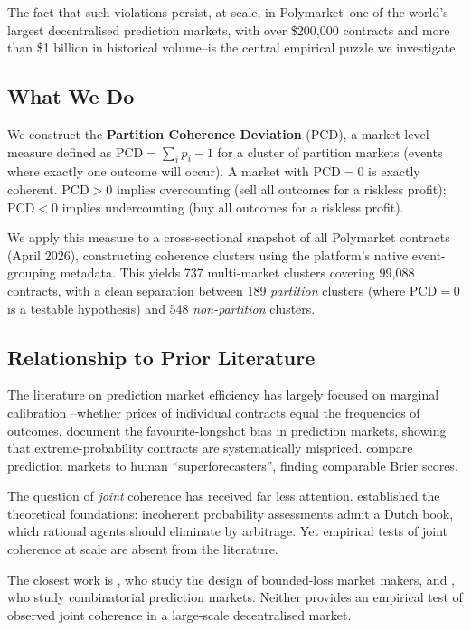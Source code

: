 \documentclass[12pt,a4paper]{article}
\theoremstyle{definition}
\theoremstyle{remark}
\newcommand{\PCD}{\mathrm{PCD}}
\begin{document}
The fact that such violations persist, at scale, in Polymarket--one of the
world's largest decentralised prediction markets, with over \$200{,}000 contracts
and more than \$1 billion in historical volume--is the central empirical puzzle
we investigate.

\subsection{What We Do}

We construct the \textbf{Partition Coherence Deviation} ($\PCD$), a market-level
measure defined as $\PCD = \sum_{i} p_i - 1$ for a cluster of partition markets
(events where exactly one outcome will occur).
A market with $\PCD = 0$ is exactly coherent.
$\PCD > 0$ implies overcounting (sell all outcomes for a riskless profit);
$\PCD < 0$ implies undercounting (buy all outcomes for a riskless profit).

We apply this measure to a cross-sectional snapshot of all Polymarket contracts
(April 2026), constructing coherence clusters using the platform's native
event-grouping metadata.
This yields 737 multi-market clusters covering 99{,}088 contracts,
with a clean separation between 189 \emph{partition} clusters (where $\PCD = 0$
is a testable hypothesis) and 548 \emph{non-partition} clusters.

\subsection{Relationship to Prior Literature}

The literature on prediction market efficiency has largely focused on marginal
calibration \citep{wolfers2004,berg2008}--whether prices of individual contracts
equal the frequencies of outcomes.
\citet{snowberg2010} document the favourite-longshot bias in prediction markets,
showing that extreme-probability contracts are systematically mispriced.
\citet{tetlock2016} compare prediction markets to human ``superforecasters'',
finding comparable Brier scores.

The question of \emph{joint} coherence has received far less attention.
\citet{deFinetti1937} established the theoretical foundations:
incoherent probability assessments admit a Dutch book, which rational agents
should eliminate by arbitrage.
Yet empirical tests of joint coherence at scale are absent from the literature.

The closest work is \citet{chen2010}, who study the design of bounded-loss
market makers, and \citet{pennock2001}, who study combinatorial prediction
markets. Neither provides an empirical test of observed joint coherence in a
large-scale decentralised market.
\end{document}

